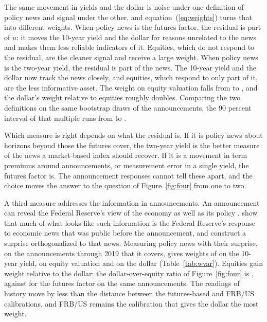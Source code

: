 \documentclass[11pt]{article}
\begin{document}
The same movement in yields and the dollar is noise under one definition of policy news and signal under the other, and equation~(\ref{eq:weights}) turns that into different weights. When policy news is the futures factor, the residual is part of $u$: it moves the 10-year yield and the dollar for reasons unrelated to the news and makes them less reliable indicators of it. Equities, which do not respond to the residual, are the cleaner signal and receive a large weight. When policy news is the two-year yield, the residual is part of the news. The 10-year yield and the dollar now track the news closely, and equities, which respond to only part of it, are the less informative asset. The weight on equity valuation falls from  to , and the dollar's weight relative to equities roughly doubles. Comparing the two definitions on the same bootstrap draws of the announcements, the 90 percent interval of that multiple runs from  to .

Which measure is right depends on what the residual is. If it is policy news about horizons beyond those the futures cover, the two-year yield is the better measure of the news a market-based index should recover. If it is a movement in term premiums around announcements, or measurement error in a single yield, the futures factor is. The announcement responses cannot tell these apart, and the choice moves the answer to the question of Figure~\ref{fig:four} from one to two.

A third measure addresses the information in announcements. An announcement can reveal the Federal Reserve's view of the economy as well as its policy \citep{nakamura2018}. \citet{bauer2023aer} show that much of what looks like such information is the Federal Reserve's response to economic news that was public before the announcement, and \citet{bauer2023} construct a surprise orthogonalized to that news. Measuring policy news with their surprise, on the  announcements through 2019 that it covers, gives weights of  on the 10-year yield,  on equity valuation and  on the dollar (Table~\ref{tab:wvar}). Equities gain weight relative to the dollar: the dollar-over-equity ratio of Figure~\ref{fig:four} is , against  for the futures factor on the same announcements. The readings of history move by less than the distance between the futures-based and FRB/US calibrations, and FRB/US remains the calibration that gives the dollar the most weight.
\end{document}
